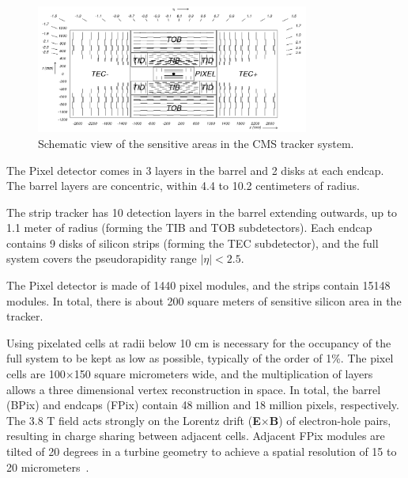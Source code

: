 \begin{figure}[htb]
  \begin{center}
    \includegraphics[width=0.8\textwidth]{Chapters/xLHCMS/fig_cmstracker.png}
    \caption{Schematic view of the sensitive areas in the CMS tracker system.}
    \label{fig:tracker}
  \end{center}
\end{figure}


The Pixel detector comes in 3 layers in the barrel and 2 disks at each
endcap. The barrel layers are concentric, within 4.4 to 10.2
centimeters of radius.

The strip tracker has 10 detection layers in the barrel extending
outwards, up to 1.1 meter of radius (forming the TIB and TOB subdetectors). Each endcap contains 9 disks of
silicon strips (forming the TEC subdetector), and the full system covers the pseudorapidity range
$\vert\eta\vert < 2.5$. 

The Pixel detector is made of 1440 pixel modules, and the strips
contain 15148 modules. In total, there is
about 200 square meters of sensitive silicon area in the tracker.


Using pixelated cells at radii below 10 cm is necessary for the occupancy
of the full system to be kept as low as possible, typically of the
order of 1\%. The pixel cells are 100$\times$150 square micrometers
wide, and the multiplication of layers allows a three dimensional
vertex reconstruction in space. In total, the barrel (BPix) and
endcaps (FPix) contain 48 million and 18 million pixels,
respectively. The 3.8 T field acts strongly on the
Lorentz drift (\textbf{E}$\times$\textbf{B}) of electron-hole pairs, resulting in charge sharing
between adjacent cells. Adjacent FPix modules are tilted of 20 degrees
in a turbine geometry to achieve a spatial resolution of 15 to 20
micrometers~\cite{Chatrchyan:2008aa}.



